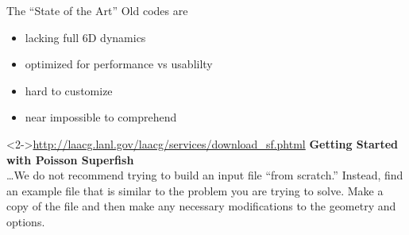\documentclass[mathserif]{beamer}
\begin{document}
\begin{frame}{The ``State of the Art''}
  Old codes are
  \begin{itemize}
    \item lacking full 6D dynamics
    \item optimized for performance vs usablilty
    \item hard to customize
    \item near impossible to comprehend
  \end{itemize}
  \begin{block}<2->{\url{http://laacg.lanl.gov/laacg/services/download_sf.phtml}}
    \textbf{Getting Started with Poisson Superfish}\\
    \ldots We do not recommend trying to build an input file ``from scratch.'' Instead, find an example file that is similar to the problem you are trying to solve. Make a copy of the file and then make any necessary modifications to the geometry and options.
  \end{block}
\end{frame}
\end{document}
